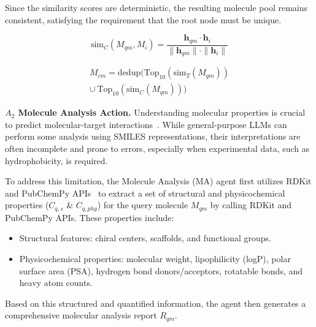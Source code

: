 \documentclass[letterpaper,twocolumn,10pt]{llncs}
\begin{document}
Since the similarity scores are deterministic, the resulting molecule pool remains consistent, satisfying the requirement that the root node must be unique.


\begin{equation}
\text{sim}_C(M_{qm}, M_i) = \frac{ \mathbf{h}_{qm} \cdot \mathbf{h}_i }{ \| \mathbf{h}_{qm} \| \cdot \| \mathbf{h}_i \| }
\end{equation}

\begin{multline}
M_{cm} = \text{dedup} \Big( \text{Top}_{10}\left(\text{sim}_T(M_{qm})\right) \\
\cup\ \text{Top}_{10}\left(\text{sim}_C(M_{qm})\right) \Big)
\end{multline}


\textbf{$A_2$ Molecule Analysis Action.}
Understanding molecular properties is crucial to predict molecular-target interactions~\cite{zheng2025large}. While general-purpose LLMs can perform some analysis using SMILES representations, their interpretations are often incomplete and prone to errors, especially when experimental data, such as hydrophobicity, is required.

To address this limitation, the Molecule Analysis (MA) agent first utilizes RDKit and PubChemPy APIs~\cite{swain2014pubchempy} to extract a set of structural and physicochemical properties ($C_{q,s}$ \& $C_{q,phy}$) for the query molecule $M_{qm}$ by calling RDKit and PubChemPy APIs. These properties include:

\begin{itemize}
\item Structural features: chiral centers, scaffolds, and functional groups.

\item Physicochemical properties: molecular weight, lipophilicity (logP), polar surface area (PSA), hydrogen bond donors/acceptors, rotatable bonds, and heavy atom counts.
\end{itemize}

Based on this structured and quantified information, the agent then generates a comprehensive molecular analysis report $R_{qm}$.

\end{document}
